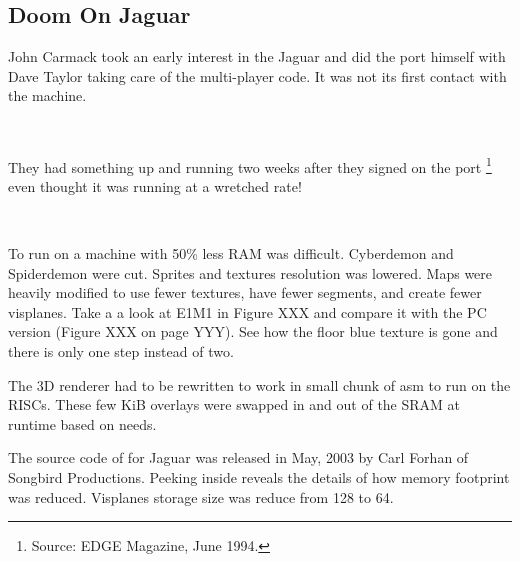 \subsection{Doom On Jaguar}
John Carmack took an early interest in the Jaguar and did the port himself with Dave Taylor taking care of the multi-player code. It was not its first contact with the machine.\\
\par
{}\\
\par
They had something up and running two weeks after they signed on the port \footnote{Source: EDGE Magazine, June 1994.} even thought it was running at a wretched rate!\\
\par
{}\\
\par
To run on a machine with 50\% less RAM was difficult. Cyberdemon and Spiderdemon were cut. Sprites and textures resolution was lowered. Maps were heavily modified to use fewer textures, have fewer segments, and create fewer visplanes. Take a a look at E1M1 in Figure XXX and compare it with the PC version (Figure XXX on page YYY). See how  the floor blue texture is gone and there is only one step instead of two.\\
\par
The 3D renderer had to be rewritten to work in small chunk of asm to run on the RISCs. These few KiB overlays were swapped in and out of the SRAM at runtime based on needs.
\par
{}
\par
The source code of \doom for Jaguar was released in May, 2003 by Carl Forhan of Songbird Productions. Peeking inside reveals the details of how memory footprint was reduced. Visplanes storage size was reduce from 128 to 64.\\

